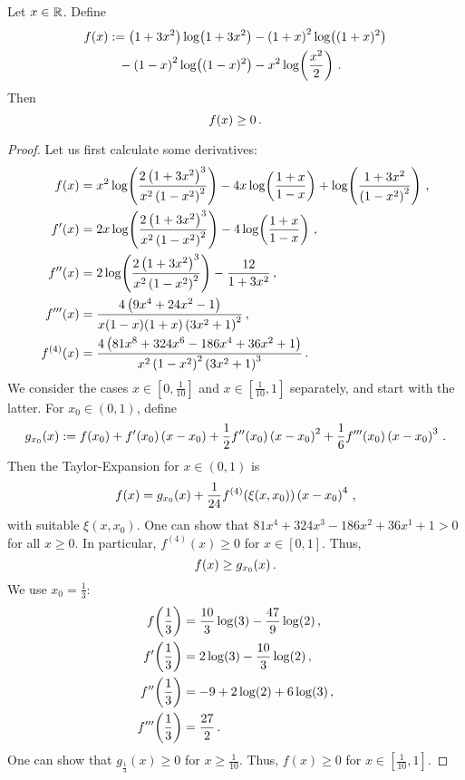 %
\begin{lemma}
	Let $x \in \mathbb{R}$.
	Define
	\begin{align*}
		f(x) &:= \left( 1+3x^2 \right) \log\!\left( 1+3x^2 \right)-\left( 1+x \right)^{2}\log\!\left( (1+x)^2 \right)
				\\&\hphantom{=}-\left( 1-x \right)^{2}\log\!\left( (1-x)^2 \right)-x^2\log\!\left( \frac{x^2}2 \right)
				\, .
	\end{align*}
	Then
	\begin{equation*}
		f(x) \geq 0
		\, .
	\end{equation*}
\end{lemma}
%
\begin{proof}
	Let us first calculate some derivatives:
	\begin{align*}
		f(x) &= x^2 \log\!\left( \frac{2\left( 1+3x^2 \right)^3}{x^2\left( 1-x^2 \right)^2} \right) - 4 x \log\!\left( \frac{1+x}{1-x} \right) + \log\!\left( \frac{1+3x^2}{\left( 1-x^2 \right)^2} \right)
		\, ,
		\\
		f^\prime(x) &= 2 x \log\!\left( \frac{2\left( 1+3x^2 \right)^3}{x^2\left( 1-x^2 \right)^2} \right) - 4 \log\!\left( \frac{1+x}{1-x} \right)\, ,
		\\
		f^{\prime\prime}(x) &= 2 \log\!\left( \frac{2\left( 1+3x^2 \right)^3}{x^2\left( 1-x^2 \right)^2} \right) - \frac{12}{1+3x^2}\, ,
		\\
		f^{\prime\prime\prime}(x) &= \frac{4\left( 9x^4+24x^2-1 \right)}{x(1-x)(1+x)\left( 3x^2+1 \right)^2}\, ,
		\\
		f^{(4)}(x) &= \frac{4\left( 81x^8+324x^6-186x^4+36x^2+1 \right)}{x^2\left( 1-x^2 \right)^2\left( 3x^2+1 \right)^3}
		\, .
	\end{align*}
	We consider the cases $x \in [0,\frac1{10}]$ and  $x \in [\frac1{10},1]$ separately, and start with the latter.
	For $x_0 \in (0,1)$, define
	\begin{equation*}
		g_{x_0}(x) := f(x_0) + f^\prime(x_0)\left( x-x_0 \right) + \frac12f^{\prime\prime}(x_0)\left( x-x_0 \right)^2 + \frac16f^{\prime\prime\prime}(x_0)\left( x-x_0 \right)^3
		\, .
	\end{equation*}
	Then the Taylor-Expansion for $x\in(0,1)$ is
	\begin{equation*}
		f(x) = g_{x_0}(x) + \frac{1}{24} f^{(4)}(\xi(x,x_0)) \left( x-x_0 \right)^4
		\, ,
	\end{equation*}
	with suitable $\xi(x,x_0)$.
	One can show that $81x^4+324x^3-186x^2+36x^1+1 > 0$ for all $x\geq 0$. In particular, $f^{(4)}(x) \geq 0$ for $x \in[0,1]$.
	Thus,
	\begin{equation*}
		f(x) \geq  g_{x_0}(x)
		\, .
	\end{equation*}
	We use $x_0 = \frac13$:
	\begin{align*}
		f\!\left( \frac13 \right) &= \frac{10}{3} \log(3) - \frac{47}{9}\log(2)\, ,
		\\
		f^\prime\!\left( \frac13 \right) &= 2\log(3) - \frac{10}{3}\log(2)\, ,
		\\
		f^{\prime\prime}\!\left( \frac13 \right) &= -9+2\log(2)+6\log(3)\, ,
		\\
		f^{\prime\prime\prime}\!\left( \frac13 \right) &= \frac{27}{2}
		\, .
	\end{align*}
	One can show that $g_{\frac13}(x) \geq 0$ for $x \geq \frac1{10}$. Thus, $f(x)\geq 0$ for $x \in [\frac1{10},1]$.
	

\end{proof}
